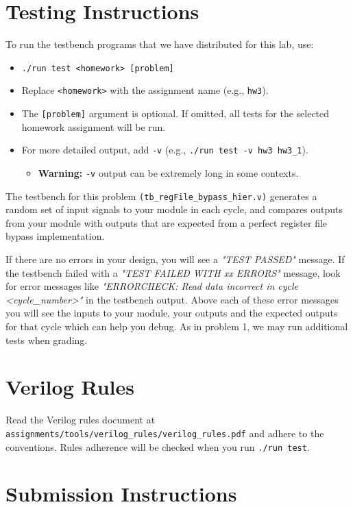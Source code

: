 \documentclass[12pt]{article}
\begin{document}
\section*{Testing Instructions}

To run the testbench programs that we have distributed for this lab, use:
\begin{itemize}
\item \texttt{./run test <homework> [problem]}
\item Replace \texttt{<homework>} with the assignment name (e.g., \texttt{hw3}).
\item The \texttt{[problem]} argument is optional. If omitted, all tests for the selected homework assignment will be run.
\item For more detailed output, add \texttt{-v} (e.g., \texttt{./run test -v hw3 hw3\_1}).
\begin{itemize}
\item \textbf{Warning:} \texttt{-v} output can be extremely long in some contexts.
\end{itemize}
\end{itemize}

The testbench for this problem \texttt{(tb\_regFile\_bypass\_hier.v)} generates a random set of input
signals to your module in each cycle, and compares outputs from your module with outputs that are expected
from a perfect register file bypass implementation.

If there are no errors in your design, you will see a \textit{"TEST PASSED"} message. If the testbench failed with
a \textit{"TEST FAILED WITH xx ERRORS"} message, look for error messages like \textit{"ERRORCHECK: Read data
incorrect in cycle <cycle\_number>"} in the testbench output. Above each of these error messages you will
see the inputs to your module, your outputs and the expected outputs for that cycle which can help you
debug. As in problem 1, we may run additional tests when grading.

\section*{Verilog Rules}
Read the Verilog rules document at \texttt{assignments/tools/verilog\_rules/verilog\_rules.pdf} and adhere to the conventions.
Rules adherence will be checked when you run \texttt{./run test}.

\section*{Submission Instructions}
\end{document}
